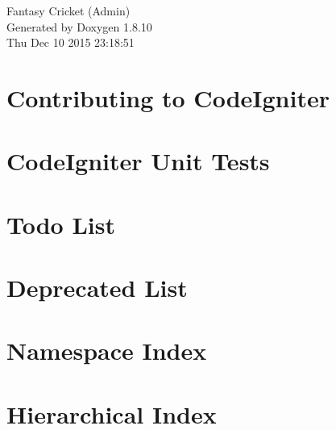 \documentclass[twoside]{book}
\newcommand{\+}{\discretionary{\mbox{\scriptsize$\hookleftarrow$}}{}{}}
\newcommand{\clearemptydoublepage}{%
  \newpage{\pagestyle{empty}\cleardoublepage}%
}
\begin{document}
\hypersetup{pageanchor=false,
             bookmarks=true,
             bookmarksnumbered=true,
             pdfencoding=unicode
            }
\begin{titlepage}
\vspace*{7cm}
\begin{center}%
{\Large Fantasy Cricket (Admin) }\\
\vspace*{1cm}
{\large Generated by Doxygen 1.8.10}\\
\vspace*{0.5cm}
{\small Thu Dec 10 2015 23:18:51}\\
\end{center}
\end{titlepage}
\clearemptydoublepage
\tableofcontents
\clearemptydoublepage
{}
\hypersetup{pageanchor=true}

\chapter{Contributing to Code\+Igniter}
\label{md__d_1_xampp_htdocs__s_d__git__l3_t2__f_c__admin_contributing}
\hypertarget{md__d_1_xampp_htdocs__s_d__git__l3_t2__f_c__admin_contributing}{}

\chapter{Code\+Igniter Unit Tests}
\label{md__d_1_xampp_htdocs__s_d__git__l3_t2__f_c__admin_tests__r_e_a_d_m_e}
\hypertarget{md__d_1_xampp_htdocs__s_d__git__l3_t2__f_c__admin_tests__r_e_a_d_m_e}{}

\chapter{Todo List}
\label{todo}
\hypertarget{todo}{}

\chapter{Deprecated List}
\label{deprecated}
\hypertarget{deprecated}{}

\chapter{Namespace Index}

\chapter{Hierarchical Index}

\end{document}
